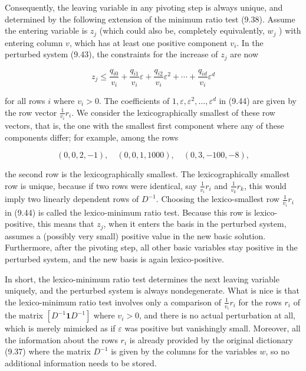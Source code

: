 \documentclass[12pt]{article}
\begin{document}
Consequently, the leaving variable in any pivoting step is always unique, and determined by the following extension of the minimum ratio test (9.38). Assume the entering variable is $z_{j}$ (which could also be, completely equivalently, $w_{j}$ ) with entering column $v$, which has at least one positive component $v_{i}$. In the perturbed system (9.43), the constraints for the increase of $z_{j}$ are now


\begin{equation*}
z_{j} \leq \frac{q_{i 0}}{v_{i}}+\frac{q_{i 1}}{v_{i}} \varepsilon+\frac{q_{i 2}}{v_{i}} \varepsilon^{2}+\cdots+\frac{q_{i d}}{v_{i}} \varepsilon^{d} \tag{9.44}
\end{equation*}


for all rows $i$ where $v_{i}>0$. The coefficients of $1, \varepsilon, \varepsilon^{2}, \ldots, \varepsilon^{d}$ in (9.44) are given by the row vector $\frac{1}{v_{i}} r_{i}$. We consider the lexicographically smallest of these row vectors, that is, the one with the smallest first component where any of these components differ; for example, among the rows

$$
(0,0,2,-1), \quad(0,0,1,1000), \quad(0,3,-100,-8),
$$

the second row is the lexicographically smallest. The lexicographically smallest row is unique, because if two rows were identical, say $\frac{1}{v_{i}} r_{i}$ and $\frac{1}{v_{k}} r_{k}$, this would imply two linearly dependent rows of $D^{-1}$. Choosing the lexico-smallest row $\frac{1}{v_{i}} r_{i}$ in (9.44) is called the lexico-minimum ratio test. Because this row is lexico-positive, this means that $z_{j}$, when it enters the basis in the perturbed system, assumes a (possibly very small) positive value in the new basic solution. Furthermore, after the pivoting step, all other basic variables stay positive in the perturbed system, and the new basis is again lexico-positive.

In short, the lexico-minimum ratio test determines the next leaving variable uniquely, and the perturbed system is always nondegenerate. What is nice is that the lexico-minimum ratio test involves only a comparison of $\frac{1}{v_{i}} r_{i}$ for the rows $r_{i}$ of the matrix $\left[D^{-1} \mathbf{1} D^{-1}\right]$ where $v_{i}>0$, and there is no actual perturbation at all, which is merely mimicked as if $\varepsilon$ was positive but vanishingly small. Moreover, all the information about the rows $r_{i}$ is already provided by the original dictionary (9.37) where the matrix $D^{-1}$ is given by the columns for the variables $w$, so no additional information needs to be stored.
\end{document}

